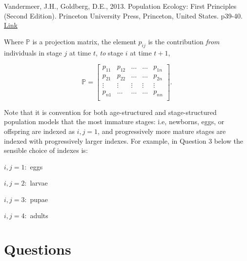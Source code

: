 \documentclass[]{book}
\begin{document}
Vandermeer, J.H., Goldberg, D.E., 2013. Population Ecology: First
Principles (Second Edition). Princeton University Press, Princeton,
United States. p39-40.
\href{https://ebookcentral-proquest-com.qe2a-proxy.mun.ca/lib/mun/detail.action?docID=1205619}{Link}

Where \(\mathbb{P}\) is a projection matrix, the element \(p_{ij}\) is
the contribution \emph{from} individuals in stage \(j\) at time \(t\),
\emph{to} stage \(i\) at time \(t+1\),

\begin{equation}
\mathbb{P} = 
\left[
\begin{array}{ccccc}
p_{11} & p_{12} & \dots & \dots & p_{1n} \\
p_{21} & p_{22} & \dots & \dots & p_{2n} \\
\vdots & \vdots & \vdots & \vdots & \vdots \\
p_{n1} & \dots & \dots & \dots & p_{nn} \\
\end{array}
\right].
\end{equation}

Note that it is convention for both age-structured and stage-structured
population models that the most immature stages: i.e, newborns, eggs, or
offspring are indexed as \(i,j = 1\), and progressively more mature
stages are indexed with progressively larger indexes. For example, in
Question 3 below the sensible choice of indexes is:

\(i,j = 1:\) eggs

\(i,j = 2:\) larvae

\(i,j = 3:\) pupae

\(i,j = 4:\) adults

\section{Questions}\label{questions}
\end{document}
